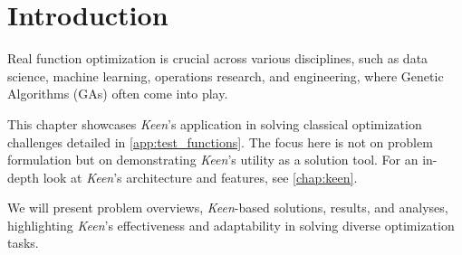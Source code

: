 \section{Introduction}
\label{sec:fn_opt:intro}
  Real function optimization is crucial across various disciplines, such as data science, machine learning, operations research, and engineering, where Genetic Algorithms (GAs) often come into play.

  This chapter showcases \textit{Keen}'s application in solving classical optimization challenges detailed in \vref{app:test_functions}. The focus here is not on problem formulation but on demonstrating \textit{Keen}'s utility as a solution tool. For an in-depth look at \textit{Keen}'s architecture and features, see \vref{chap:keen}.

  We will present problem overviews, \textit{Keen}-based solutions, results, and analyses, highlighting \textit{Keen}'s effectiveness and adaptability in solving diverse optimization tasks.

